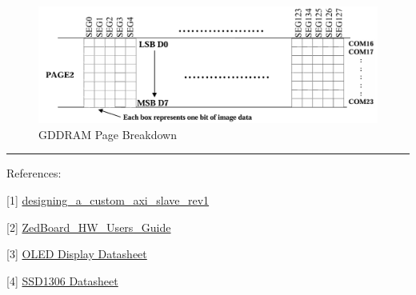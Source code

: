 \begin{figure}
\centering
\includegraphics{images/gddram_page_breakdown.png}
\caption{GDDRAM Page Breakdown}
\end{figure}

\begin{center}\rule{0.5\linewidth}{0.5pt}\end{center}

References:

{[}1{]}
\href{https://www.avnet.com/wps/wcm/connect/onesite/557e3453-20d7-4737-b2a8-8afc404dc81e/designing_a_custom_axi_slave_rev1.pdf?MOD=AJPERES\&CVID=nxFlYvm\&CVID=nxFlYvm\&CVID=nxFlYvm\&CVID=nxFlYvm}{designing\_a\_custom\_axi\_slave\_rev1}

{[}2{]}
\href{https://www.avnet.com/wps/wcm/connect/onesite/922900e3-3d57-4cc7-883f-a8b9fbea0cd0/ZedBoard_HW_UG_v2_2.pdf?MOD=AJPERES\&CACHEID=ROOTWORKSPACE.Z18_NA5A1I41L0ICD0ABNDMDDG0000-922900e3-3d57-4cc7-883f-a8b9fbea0cd0-nxyWMFS}{ZedBoard\_HW\_Users\_Guide}

{[}3{]}
\href{https://cdn-shop.adafruit.com/datasheets/UG-2832HSWEG04.pdf}{OLED
Display Datasheet}

{[}4{]}
\href{https://cdn-shop.adafruit.com/datasheets/SSD1306.pdf}{SSD1306
Datasheet}
